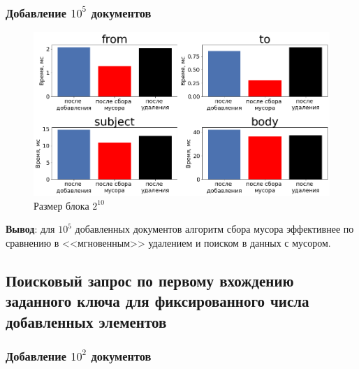 \subsubsection{Добавление $10^5$ документов}

\begin{figure}[H]
\includegraphics[width=\linewidth]{fig/limit_1e6/1e5/search.png}
\caption{Размер блока $2^{10}$}
\end{figure}

\textbf{Вывод}: для $10^5$ добавленных документов алгоритм сбора мусора эффективнее
по сравнению в <<мгновенным>> удалением и поиском в данных с мусором.

\newpage
\subsection{Поисковый запрос по первому вхождению заданного ключа для фиксированного числа добавленных элементов}

\subsubsection{Добавление $10^2$ документов}

